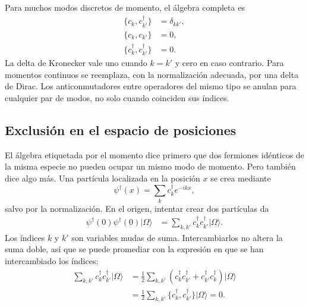 Para muchos modos discretos de momento, el álgebra completa es
\begin{align}
\{c_k,c_{k'}^\dagger\}&=\delta_{kk'},
\\
\{c_k,c_{k'}\}&=0,
\\
\{c_k^\dagger,c_{k'}^\dagger\}&=0.
\end{align}
La delta de Kronecker vale uno cuando \(k=k'\) y cero en caso contrario. Para momentos continuos se reemplaza, con la normalización adecuada, por una delta de Dirac. Los anticonmutadores entre operadores del mismo tipo se anulan para cualquier par de modos, no solo cuando coinciden sus índices.

\subsection{Exclusión en el espacio de posiciones}

El álgebra etiquetada por el momento dice primero que dos fermiones idénticos de la misma especie no pueden ocupar un mismo modo de momento. Pero también dice algo más. Una partícula localizada en la posición \(x\) se crea mediante
\begin{equation}
\psi^\dagger(x)=\sum_k c_k^\dagger e^{-ikx},
\end{equation}
salvo por la normalización. En el origen, intentar crear dos partículas da
\begin{align}
\psi^\dagger(0)\psi^\dagger(0)|\Omega\rangle
&=\sum_{k,k'}c_k^\dagger c_{k'}^\dagger|\Omega\rangle.
\end{align}
Los índices \(k\) y \(k'\) son variables mudas de suma. Intercambiarlos no altera la suma doble, así que se puede promediar con la expresión en que se han intercambiado los índices:
\begin{align}
\sum_{k,k'}c_k^\dagger c_{k'}^\dagger|\Omega\rangle
&=\frac12\sum_{k,k'}
\left(c_k^\dagger c_{k'}^\dagger
+c_{k'}^\dagger c_k^\dagger\right)|\Omega\rangle
\\
&=\frac12\sum_{k,k'}
\{c_k^\dagger,c_{k'}^\dagger\}|\Omega\rangle
=0.
\end{align}

\begin{classroomqa}\end{classroomqa}

